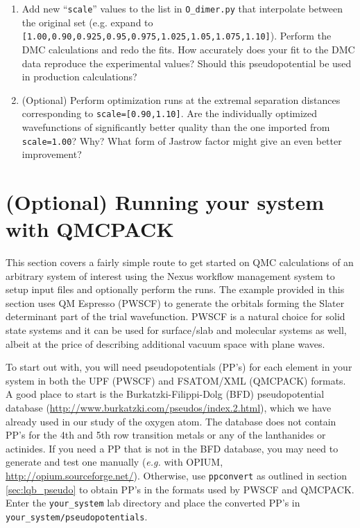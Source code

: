\begin{enumerate}
  \item{Add new ``\texttt{scale}'' values to the list in \texttt{O\_dimer.py} that interpolate between the original set (e.g. expand to \texttt{[1.00,0.90,0.925,0.95,0.975,1.025,1.05,1.075,1.10]}).  Perform the DMC calculations and redo the fits.  How accurately does your fit to the DMC data reproduce the experimental values?  Should this pseudopotential be used in production calculations?}

  \item{(Optional) Perform optimization runs at the extremal separation distances corresponding to \texttt{scale=[0.90,1.10]}}.  Are the individually optimized wavefunctions of significantly better quality than the one imported from \texttt{scale=1.00}?  Why?  What form of Jastrow factor might give an even better improvement? 
\end{enumerate}




\section{(Optional) Running your system with QMCPACK}\label{sec:your_system}
This section covers a fairly simple route to get started on QMC calculations of an arbitrary system of interest using the Nexus workflow management system to setup input files and optionally perform the runs.  The example provided in this section uses QM Espresso (PWSCF) to generate the orbitals forming the Slater determinant part of the trial wavefunction.  PWSCF is a natural choice for solid state systems and it can be used for surface/slab and molecular systems as well, albeit at the price of describing additional vacuum space with plane waves.

To start out with, you will need pseudopotentials (PP's) for each element in your system in both the UPF (PWSCF) and FSATOM/XML (QMCPACK) formats.  A good place to start is the Burkatzki-Filippi-Dolg (BFD) pseudopotential database \newline (\href{http://www.burkatzki.com/pseudos/index.2.html}{http://www.burkatzki.com/pseudos/index.2.html}), which we have already used in our study of the oxygen atom.  The database does not contain PP's for the 4th and 5th row transition metals or any of the lanthanides or actinides.  If you need a PP that is not in the BFD database, you may need to generate and test one manually (\emph{e.g.} with OPIUM, \href{http://opium.sourceforge.net/}{http://opium.sourceforge.net/}).  Otherwise, use \texttt{ppconvert} as outlined in section \ref{sec:lqb_pseudo} to obtain PP's in the formats used by PWSCF and QMCPACK.  Enter the \texttt{your\_system} lab directory and place the converted PP's in \texttt{your\_system/pseudopotentials}.

